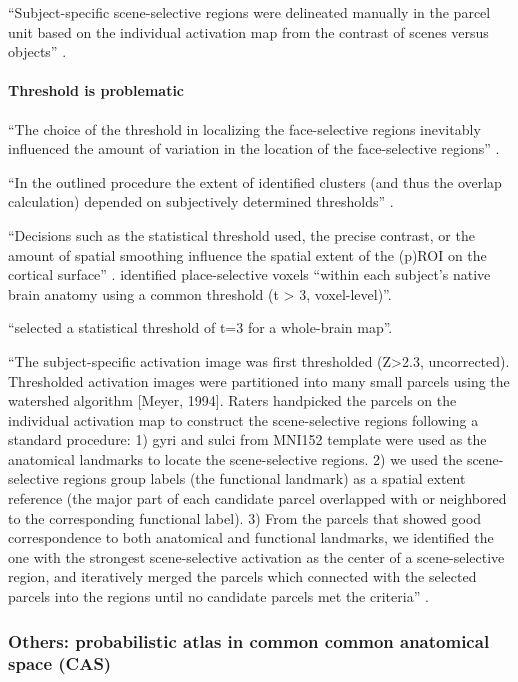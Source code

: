 %
``Subject-specific scene-selective regions were delineated manually in the
parcel unit based on the individual activation map from the contrast of scenes
versus objects'' \citep{zhen2017quantifying}.


\paragraph{Threshold is problematic}

%
``The choice of the threshold in localizing the face-selective regions
inevitably influenced the amount of variation in the location of the
face-selective regions'' \citep{zhen2015quantifying}.

%
``In the outlined procedure the extent of identified clusters (and thus the
overlap calculation) depended on subjectively determined thresholds''
\citep{frost2012measuring}.

%
``Decisions such as the statistical threshold used, the precise contrast, or the
amount of spatial smoothing influence the spatial extent of the (p)ROI on the
cortical surface'' \citep{weiner2018defining}.
%
\citet{weiner2018defining} identified place-selective voxels ``within each
subject's native brain anatomy using a common threshold (t > 3, voxel-level)''.

%
\citet{rosenke2021probabilistic} ``selected a statistical threshold of t=3 for a
whole-brain map''.


%
``The subject-specific activation image was first thresholded (Z>2.3,
uncorrected).
%
Thresholded activation images were partitioned into many small parcels using the
watershed algorithm [Meyer, 1994].
%
Raters handpicked the parcels on the individual activation map to construct the
scene-selective regions following a standard procedure:
%
1) gyri and sulci from MNI152 template were used as the anatomical landmarks to
locate the scene-selective regions.
%
2) we used the scene-selective regions group labels (the functional landmark) as
a spatial extent reference (the major part of each candidate parcel overlapped
with or neighbored to the corresponding functional label).
%
3) From the parcels that showed good correspondence to both anatomical and
functional landmarks, we identified the one with the strongest scene-selective
activation as the center of a scene-selective region, and iteratively merged the
parcels which connected with the selected parcels into the regions until no
candidate parcels met the criteria'' \citep{zhen2017quantifying}.


\subsubsection{Others: probabilistic atlas in common common anatomical space
(CAS)}

